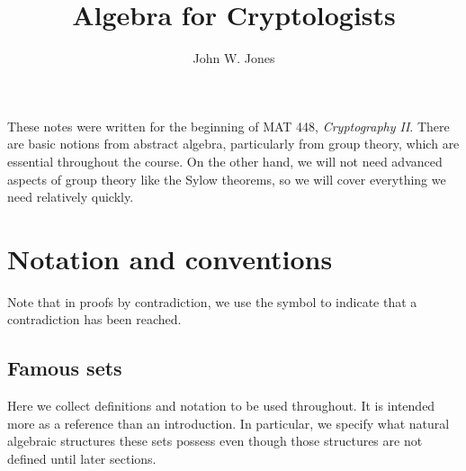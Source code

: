 \documentclass[12pt]{amsart}
\title{Algebra for Cryptologists}
\author{John W.{} Jones}
\theoremstyle{plain}
\theoremstyle{definition}
\theoremstyle{remark}
\begin{document}
\maketitle

These notes were written for the beginning of MAT 448, \emph{Cryptography
II}.  There are basic notions from abstract algebra, particularly from
group theory, which are essential
throughout the course.  On the other hand, we will not need advanced
aspects of group theory like the Sylow theorems, so we will cover
everything we need relatively quickly.


\tableofcontents

\section{Notation and conventions}
Note that in proofs by contradiction, we use the symbol \con{} to
indicate that a contradiction has been reached.

\subsection{Famous sets}
Here we collect definitions and notation to be used throughout.  It is
intended more as a reference than an introduction.  In particular, we
specify what natural algebraic structures these sets possess even
though those structures are not defined until later sections.
\end{document}
